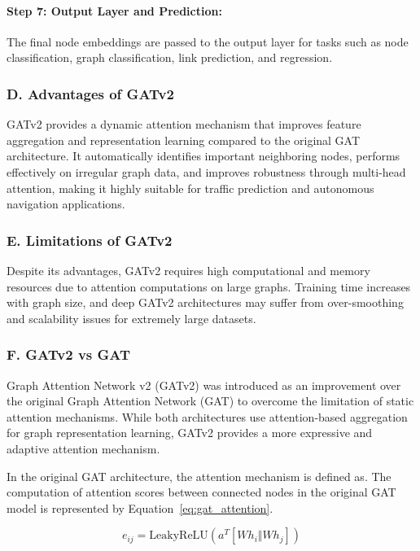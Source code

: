 \paragraph{Step 7: Output Layer and Prediction:}

The final node embeddings are passed to the output layer for tasks such as node classification, graph classification, link prediction, and regression.

\subsubsection{D.   Advantages of GATv2}

GATv2 provides a dynamic attention mechanism that improves feature aggregation and representation learning compared to the original GAT architecture. It automatically identifies important neighboring nodes, performs effectively on irregular graph data, and improves robustness through multi-head attention, making it highly suitable for traffic prediction and autonomous navigation applications.

\subsubsection{E.   Limitations of GATv2}

Despite its advantages, GATv2 requires high computational and memory resources due to attention computations on large graphs. Training time increases with graph size, and deep GATv2 architectures may suffer from over-smoothing and scalability issues for extremely large datasets.

\subsubsection{ F.   GATv2 vs GAT}

Graph Attention Network v2 (GATv2) was introduced as an improvement over the original Graph Attention Network (GAT) to overcome the limitation of static attention mechanisms. While both architectures use attention-based aggregation for graph representation learning, GATv2 provides a more expressive and adaptive attention mechanism.

In the original GAT architecture, the attention mechanism is defined as. The computation of attention scores between connected nodes in the original GAT model is represented by Equation~\eqref{eq:gat_attention}.

\begin{equation}
e_{ij} = \text{LeakyReLU}\left(a^{T}[Wh_i \Vert Wh_j]\right)
\label{eq:gat_attention}
\end{equation}

